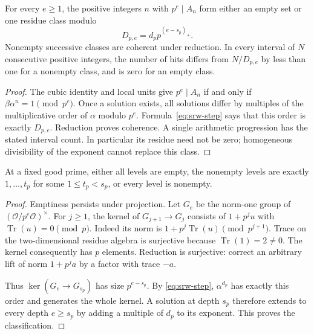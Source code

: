 \begin{theorem}\label{thm:srw-lattice}
For every $e\ge1$, the positive integers $n$ with $p^e\mid A_n$ form either
an empty set or one residue class modulo
\[
 D_{p,e}=d_p p^{(e-s_p)_+}.
\]
Nonempty successive classes are coherent under reduction. In every interval
of $N$ consecutive positive integers, the number of hits differs from
$N/D_{p,e}$ by less than one for a nonempty class, and is zero for an empty
class.
\end{theorem}
\begin{proof}
The cubic identity and local units give
$p^e\mid A_n$ if and only if $\beta\alpha^n=1\pmod {p^e}$. Once a
solution exists, all solutions differ by multiples of the multiplicative order
of $\alpha$ modulo $p^e$. Formula~\eqref{eq:srw-step} says that this order
is exactly $D_{p,e}$. Reduction proves coherence. A single arithmetic
progression has the stated interval count. In particular its residue need not
be zero; homogeneous divisibility of the exponent cannot replace this class.
\end{proof}

\begin{theorem}\label{thm:srw-tower}
At a fixed good prime, either all levels are empty, the nonempty levels are
exactly $1,\ldots,t_p$ for some $1\le t_p<s_p$, or every level is nonempty.
\end{theorem}
\begin{proof}
Emptiness persists under projection. Let $G_e$ be the norm-one group of
$(\mathcal O/p^e\mathcal O)^\times$. For $j\ge1$, the kernel of
$G_{j+1}\to G_j$ consists of $1+p^ju$ with
$\operatorname{Tr}(u)=0\pmod p$. Indeed its norm is
$1+p^j\operatorname{Tr}(u)\pmod {p^{j+1}}$. Trace on the two-dimensional
residue algebra is surjective because $\operatorname{Tr}(1)=2\ne0$.
The kernel consequently has $p$ elements. Reduction is surjective: correct
an arbitrary lift of norm $1+p^ja$ by a factor with trace $-a$.

Thus $\ker(G_e\to G_{s_p})$ has size $p^{e-s_p}$. By
\eqref{eq:srw-step}, $\alpha^{d_p}$ has exactly this order and generates
the whole kernel. A solution at depth $s_p$ therefore extends to every depth
$e\ge s_p$ by adding a multiple of $d_p$ to its exponent. This proves the
classification.
\end{proof}

